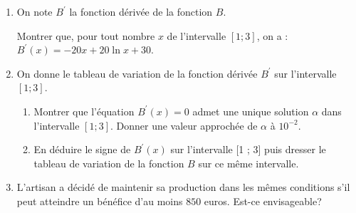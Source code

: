 \begin{enumerate}
     \item
     On note $B^{\prime}$ la fonction dérivée de la fonction $B$.
     \par
     Montrer que, pour tout nombre $x$ de l'intervalle $\left[1 ; 3\right]$, on a : $B^{\prime}\left(x\right) =-20x +20 \ln x+30$.
     \item
     On donne le tableau de variation de la fonction dérivée $B^{\prime}$ sur l'intervalle $\left[1 ; 3\right]$.
\begin{center}
 \begin{extern}%
   \end{extern}
\end{center}
\begin{enumerate}[label=\alph*.]
          \item
          Montrer que l'équation $B^{\prime}\left(x\right)=0$ admet une unique solution $\alpha $ dans l'intervalle $\left[1 ; 3\right]$. Donner une valeur approchée de $\alpha $ à $10^{-2}$.
          \item
     En déduire le signe de $B^{\prime}\left(x\right)$ sur l'intervalle [1 ; 3] puis dresser le tableau de variation de la fonction $B$ sur ce même intervalle.\end{enumerate}
     \item
     L'artisan a décidé de maintenir sa production dans les mêmes conditions s'il peut atteindre un bénéfice d'au moins $850$ euros. Est-ce envisageable?
\end{enumerate}
